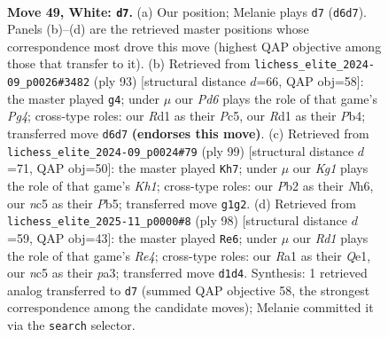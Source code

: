 \documentclass[11pt]{article}
\begin{document}
\clearpage

\begin{figure}[p]\centering
\begin{subfigure}{0.46\textwidth}\centering
\resizebox{\linewidth}{!}{%
\newchessgame
\chessboard[
  setfen={5rk1/p7/1p1P4/2n1Qp1q/P1p5/6P1/1P6/R2R2K1 w - - 4 49},
  showmover=false,
  pgfstyle=straightmove, color=movearrow, markmove={d6-d7}
]}
\caption{}
\end{subfigure}\hfill
\begin{subfigure}{0.46\textwidth}\centering
\resizebox{\linewidth}{!}{%
\newchessgame
\chessboard[
  setfen={6k1/4q3/4P3/1Qp3p1/Pp1r3p/7P/6P1/4R2K b - - 2 47},
  showmover=false,
  pgfstyle=straightmove, color=movearrow, markmove={g5-g4}
]}
\caption{}
\end{subfigure}
\\[4pt]
\begin{subfigure}{0.46\textwidth}\centering
\resizebox{\linewidth}{!}{%
\newchessgame
\chessboard[
  setfen={7k/p4r2/2Q2p1n/1p4q1/3PR3/6NP/PP3PP1/6K1 b - - 1 50},
  showmover=false,
  pgfstyle=straightmove, color=movearrow, markmove={h8-h7}
]}
\caption{}
\end{subfigure}\hfill
\begin{subfigure}{0.46\textwidth}\centering
\resizebox{\linewidth}{!}{%
\newchessgame
\chessboard[
  setfen={5rk1/1r5p/1P1p2p1/3P4/1R2RP2/p1P5/2q5/K3Q3 w - - 7 50},
  showmover=false,
  pgfstyle=straightmove, color=movearrow, markmove={e4-e6}
]}
\caption{}
\end{subfigure}
\caption{\textbf{Move 49, White: \texttt{d7}.} (a) Our position; Melanie plays \texttt{d7} (\texttt{d6d7}). Panels (b)--(d) are the retrieved master positions whose correspondence most drove this move (highest QAP objective among those that transfer to it). (b) Retrieved from \texttt{lichess\_elite\_2024-09\_p0026\#3482} (ply 93) [structural distance $d$=66, QAP obj=58]: the master played \texttt{g4}; under $\mu$ our \emph{Pd6} plays the role of that game's \emph{Pg4}; cross-type roles: our \emph{R}d1 as their \emph{P}c5, our \emph{R}d1 as their \emph{P}b4; transferred move \texttt{d6d7} \textbf{(endorses this move)}. (c) Retrieved from \texttt{lichess\_elite\_2024-09\_p0024\#79} (ply 99) [structural distance $d$=71, QAP obj=50]: the master played \texttt{Kh7}; under $\mu$ our \emph{Kg1} plays the role of that game's \emph{Kh1}; cross-type roles: our \emph{P}b2 as their \emph{N}h6, our \emph{n}c5 as their \emph{P}b5; transferred move \texttt{g1g2}. (d) Retrieved from \texttt{lichess\_elite\_2025-11\_p0000\#8} (ply 98) [structural distance $d$=59, QAP obj=43]: the master played \texttt{Re6}; under $\mu$ our \emph{Rd1} plays the role of that game's \emph{Re4}; cross-type roles: our \emph{R}a1 as their \emph{Q}e1, our \emph{n}c5 as their \emph{p}a3; transferred move \texttt{d1d4}. Synthesis: 1 retrieved analog transferred to \texttt{d7} (summed QAP objective 58, the strongest correspondence among the candidate moves); Melanie committed it via the \texttt{search} selector.}
\label{fig:thought-m96}
\end{figure}
\end{document}
